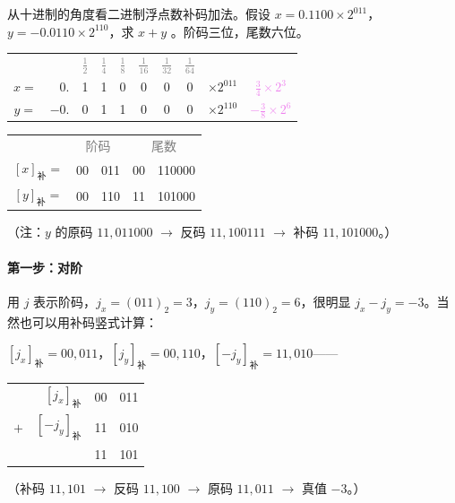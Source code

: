 \documentclass[UTF8]{ctexart}
\newcommand\littleword[1]{\textcolor{gray}{\footnotesize #1}}
\begin{document}
{\color{cyan!50!black}
从十进制的角度看二进制浮点数补码加法。假设 $x=0.1100\times 2^{011}$，$y=-0.0110\times 2^{110}$，求 $x+y$ 。阶码三位，尾数六位。
}

\begin{table}[htb]
  \centering
  \begin{tabular}{crccccccc@{\qquad}c}
  & & \littleword{$\frac12$} &  \littleword{$\frac14$} &  \littleword{$\frac18$} &  \littleword{$\frac{1}{16}$} & \littleword{$\frac{1}{32}$} & \littleword{$\frac{1}{64}$} \\
  $x=$ & $0.$ & 1 & 1 & 0 & 0 & 0 & 0 & $\times 2^{011}$ & \textcolor{violet}{$\frac34\times 2^3$}\\
  $y=$ & $-0.$ & 0 & 1 & 1 & 0 & 0 & 0 & $\times 2^{110}$ & \textcolor{violet}{$-\frac{3}{8}\times 2^6$}\\
  \end{tabular}


  \begin{tabular}{cc@{\ ,\ }c@{\quad ;\quad }c@{\ ,\ }c}
    & \multicolumn{2}{c}{\littleword{阶码}} & \multicolumn{2}{c}{\littleword{尾数}} \\
    $[x]_{\text{补}} = $ & 00 & 011 & 00 & 110000 \\
    $[y]_{\text{补}} = $ & 00 & 110 & 11 & 101000 \\
  \end{tabular}
\end{table}

（注：$y$ 的原码 $11,011000$ $\to$ 反码 $11,100111$ $\to$ 补码 $11,101000$。）


\paragraph{第一步：对阶}
用 $j$ 表示阶码，$j_x = (011)_2 = 3$，$j_y = (110)_2 = 6$，很明显 $j_x-j_y=-3$。当然也可以用补码竖式计算：

$[j_x]_{\text{补}} = 00,011$，$[j_y]_{\text{补}} = 00,110$，$[-j_y]_{\text{补}} = 11,010$——
\begin{table}[htb]
  \centering
  \begin{tabular}{lr@{\quad}c@{\ ,\ }c}
      & $[j_x]_{\text{补}}$ & 00 & 011 \\
  $+$ & $[-j_y]_{\text{补}}$ &11 & 010 \\
  \hline
      & & 11 & 101 \\
  \end{tabular}
\end{table}

（补码 $11,101$ $\to$ 反码 $11,100$ $\to$ 原码 $11,011$ $\to$ 真值 $-3$。）
\end{document}
